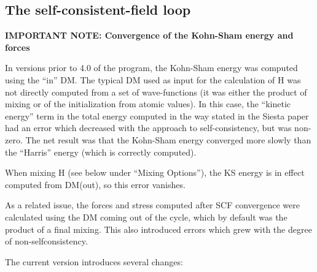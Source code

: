 \subsection{The self-consistent-field loop}
\label{sec:scf}

\textbf{IMPORTANT NOTE: Convergence of the Kohn-Sham energy and forces}

In versions prior to 4.0 of the program, the Kohn-Sham energy was computed
using the ``in'' DM. The typical DM used as input for the calculation
of H was not directly computed from a set of wave-functions (it was
either the product of mixing or of the initialization from atomic
values). In this case, the ``kinetic energy'' term in the total energy
computed in the way stated in the Siesta paper had an error which
decreased with the approach to self-consistency, but was non-zero. The
net result was that the Kohn-Sham energy converged more slowly than
the ``Harris'' energy (which is correctly computed).

When mixing H (see below under ``Mixing Options''), the KS energy is
in effect computed from DM(out), so this error vanishes.

As a related issue, the forces and stress computed after SCF
convergence were calculated using the DM coming out of the cycle,
which by default was the product of a final mixing. This also
introduced errors which grew with the degree of non-selfconsistency.

The current version introduces several changes:

